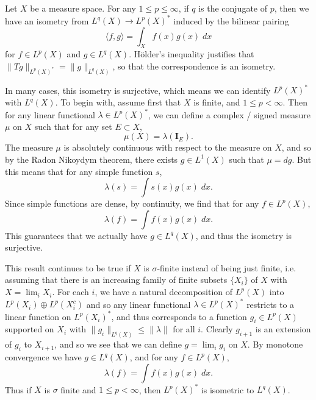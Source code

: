 \begin{example}
    Let $X$ be a measure space. For any $1 \leq p \leq \infty$, if $q$ is the conjugate of $p$, then we have an isometry from $L^q(X) \to L^p(X)^*$ induced by the bilinear pairing
    \[ \langle f, g \rangle = \int_X f(x) g(x)\; dx \]
    for $f \in L^p(X)$ and $g \in L^q(X)$. H\"{o}lder's inequality justifies that $\| Tg \|_{L^p(X)^*} = \| g \|_{L^q(X)}$, so that the correspondence is an isometry.

    In many cases, this isometry is surjective, which means we can identify $L^p(X)^*$ with $L^q(X)$. To begin with, assume first that $X$ is finite, and $1 \leq p < \infty$. Then for any linear functional $\lambda \in L^p(X)^*$, we can define a complex / signed measure $\mu$ on $X$ such that for any set $E \subset X$,
    \[ \mu(X) = \lambda(\mathbf{I}_E). \]
    The measure $\mu$ is absolutely continuous with respect to the measure on $X$, and so by the Radon Nikoydym theorem, there exists $g \in L^1(X)$ such that $\mu = dg$. But this means that for any simple function $s$,
    \[ \lambda(s) = \int s(x) g(x)\; dx. \]
    Since simple functions are dense, by continuity, we find that for any $f \in L^p(X)$,
    \[ \lambda(f) = \int f(x) g(x)\; dx. \]
    This guarantees that we actually have $g \in L^q(X)$, and thus the isometry is surjective.

    This result continues to be true if $X$ is $\sigma$-finite instead of being just finite, i.e. assuming that there is an increasing family of finite subsets $\{ X_i \}$ of $X$ with $X = \lim_i X_i$. For each $i$, we have a natural decomposition of $L^p(X)$ into $L^p(X_i) \oplus L^p(X_i^c)$ and so any linear functional $\lambda \in L^p(X)^*$ restricts to a linear function on $L^p(X_i)^*$, and thus corresponds to a function $g_i \in L^p(X)$ supported on $X_i$ with $\| g_i \|_{L^q(X)} \leq \| \lambda \|$ for all $i$. Clearly $g_{i+1}$ is an extension of $g_i$ to $X_{i+1}$, and so we see that we can define $g = \lim_i g_i$ on $X$. By monotone convergence we have $g \in L^q(X)$, and for any $f \in L^p(X)$,
    \[ \lambda(f) = \int f(x) g(x)\; dx. \]
    Thus if $X$ is $\sigma$ finite and $1 \leq p < \infty$, then $L^p(X)^*$ is isometric to $L^q(X)$.


\end{example}
